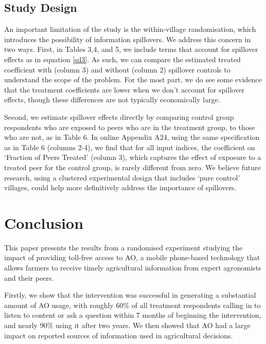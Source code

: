\documentclass[12pt]{article}
\begin{document}
\subsection{\protect\normalsize Study Design}

An important limitation of the study is the within-village randomisation, which introduces the possibility of information spillovers. We address this concern in two ways. First, in Tables 3,4, and 5, we include terms that account for spillover effects as in equation \eqref{sd3}. As such, we can compare the estimated treated coefficient with (column 3) and without (column 2) spillover controls to understand the scope of the problem. For the most part, we do see some evidence that the treatment coefficients are lower when we don't account for spillover effects, though these differences are not typically economically large.  

Second, we estimate spillover effects directly by comparing control group respondents who are exposed to peers who are in the treatment group, to those who are not, as in Table 6. In online Appendix A24, using the same specification as in Table 6 (columns 2-4), we find that for all input indices, the coefficient on ‘Fraction of Peers Treated’ (column 3), which captures the effect of exposure to a treated peer for the control group, is rarely different from zero. We believe future research, using a clustered experimental design that includes `pure control' villages, could help more definitively address the importance of spillovers.

\section{\protect\normalsize Conclusion}

{\normalsize This paper presents the results from a randomised experiment
studying the impact of providing toll-free access to AO, a mobile
phone-based technology that allows farmers to receive timely agricultural
information from expert agronomists and their peers. }

{\normalsize Firstly, we show that the intervention was successful in
generating a substantial amount of AO usage, with roughly 60\% of all
treatment respondents calling in to listen to content or ask a question
within 7 months of beginning the intervention, and nearly 90\% using it
after two years. We then showed that AO had a large impact on reported
sources of information used in agricultural decisions. }
\end{document}
